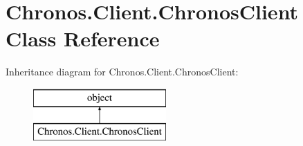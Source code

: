 \hypertarget{classChronos_1_1Client_1_1ChronosClient}{}\section{Chronos.\+Client.\+Chronos\+Client Class Reference}
\label{classChronos_1_1Client_1_1ChronosClient}
Inheritance diagram for Chronos.\+Client.\+Chronos\+Client\+:\begin{figure}[H]
\begin{center}
\leavevmode
\includegraphics[height=2.000000cm]{classChronos_1_1Client_1_1ChronosClient}
\end{center}
\end{figure}
